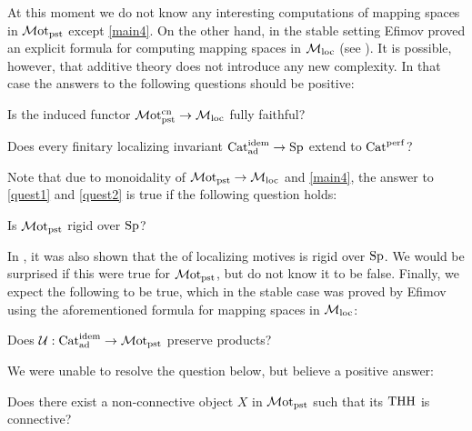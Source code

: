 \documentclass[a4paper,10pt, oneside]{amsart}
\begin{document}
At this moment we do not know any interesting computations of mapping spaces in $\mathcal{M}\mathrm{ot}_{\mathrm{pst}}$ except \cref{main4}. 
On the other hand, in the stable setting Efimov proved an explicit formula for computing mapping spaces in $\mathcal{M}_{\mathrm{loc}}$ (see \cite[Theorem~0.4]{efimov2025rigidity}). 
It is possible, however, that additive theory does not introduce any new complexity. In that case the answers to the following questions should be positive:
\begin{quest}\label{quest1}
	Is the induced functor $\mathcal{M}\mathrm{ot}^{\mathrm{cn}}_{\mathrm{pst}}\to \mathcal{M}_{\mathrm{loc}}$ fully faithful?
\end{quest}
\begin{quest}\label{quest2}
	Does every finitary localizing invariant $\mathrm{Cat}_{\mathrm{ad}}^{\mathrm{idem}}\to \mathrm{Sp}$ extend to $\mathrm{Cat}^{\mathrm{perf}}$?
\end{quest}
Note that due to monoidality of $\mathcal{M}\mathrm{ot}_{\mathrm{pst}} \to \mathcal{M}_{\mathrm{loc}}$ and \cref{main4}, the answer to \cref{quest1} and \cref{quest2} is true if  the following question holds:
\begin{quest}
	Is $\mathcal{M}\mathrm{ot}_{\mathrm{pst}}$ rigid over $\mathrm{Sp}$?
\end{quest}

In \cite{efimov2025rigidity}, it was also shown that the \infcat of localizing motives
is rigid over $\mathrm{Sp}$. We would be surprised if this were true for $\mathcal{M}\mathrm{ot}_{\mathrm{pst}}$, but do not know it to be false. 
Finally, we expect the following to be true, which in the stable case was proved by Efimov using the aforementioned formula for mapping spaces in $\mathcal{M}_{\mathrm{loc}}$:

\begin{quest} 
 	Does $\mathcal{U}: \mathrm{Cat}_{\mathrm{ad}}^{\mathrm{idem}}\to \mathcal{M}\mathrm{ot}_{\mathrm{pst}}$  preserve products?
\end{quest}

	
We were unable to resolve the question below, but believe a positive answer:
\begin{quest}
	Does there exist a non-connective object $X$  in $\mathcal{M}\mathrm{ot}_{\mathrm{pst}}$ such that its $\mathrm{THH}$ is connective?
\end{quest}

\end{document}
